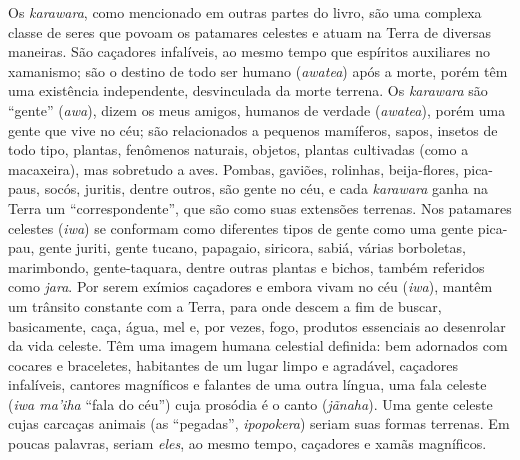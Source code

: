 Os \emph{karawara}, como mencionado em outras partes do livro, são uma
complexa classe de seres que povoam os patamares celestes e atuam na
Terra de diversas maneiras. São caçadores infalíveis, ao mesmo tempo que
espíritos auxiliares no xamanismo; são o destino de todo ser humano
(\emph{awatea}) após a morte, porém têm uma existência independente,
desvinculada da morte terrena. Os \emph{karawara} são ``gente''
(\emph{awa}), dizem os meus amigos, humanos de verdade (\emph{awatea}),
porém uma gente que vive no céu; são relacionados a pequenos mamíferos,
sapos, insetos de todo tipo, plantas, fenômenos naturais, objetos,
plantas cultivadas (como a macaxeira), mas sobretudo a aves. Pombas,
gaviões, rolinhas, beija-flores, pica-paus, socós, juritis, dentre
outros, são gente no céu, e cada \emph{karawara} ganha na Terra um
``correspondente'', que são como suas extensões terrenas. Nos patamares
celestes (\emph{iwa}) se conformam como diferentes tipos de gente como
uma gente pica-pau, gente juriti, gente tucano, papagaio, siricora,
sabiá, várias borboletas, marimbondo, gente-taquara, dentre outras
plantas e bichos, também referidos como \emph{jara}. Por serem exímios
caçadores e embora vivam no céu (\emph{iwa}), mantêm um trânsito
constante com a Terra, para onde descem a fim de buscar, basicamente,
caça, água, mel e, por vezes, fogo, produtos essenciais ao desenrolar da
vida celeste. Têm uma imagem humana celestial definida: bem adornados
com cocares e braceletes, habitantes de um lugar limpo e agradável,
caçadores infalíveis, cantores magníficos e falantes de uma outra
língua, uma fala celeste (\emph{iwa ma'iha} ``fala do céu'') cuja
prosódia é o canto (\emph{jãnaha}). Uma gente celeste cujas carcaças
animais (as ``pegadas'', \emph{ipopokera}) seriam suas formas terrenas.
Em poucas palavras, seriam \emph{eles}, ao mesmo tempo, caçadores e
xamãs magníficos.

